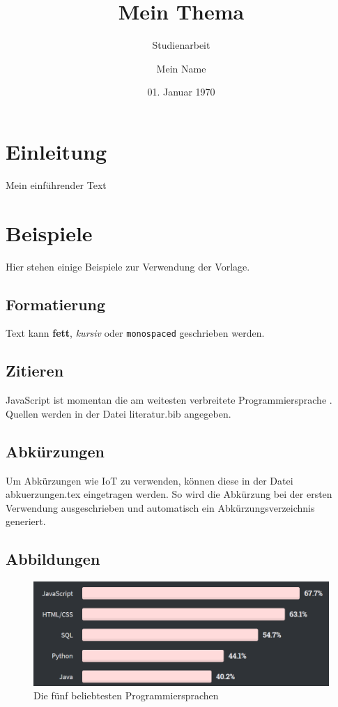 \documentclass[a4paper,12pt]{scrreprt}
\title{Mein Thema}
\subtitle{Studienarbeit}
\author{Mein Name}
\date{01. Januar 1970}
\begin{document}

\tableofcontents
\listoffigures
\listoftables
\listoflistings

\clearpage

\onehalfspacing
\chapter{Einleitung}
Mein einführender Text

\chapter{Beispiele}
Hier stehen einige Beispiele zur Verwendung der Vorlage.

\section{Formatierung}
Text kann \textbf{fett}, \textit{kursiv} oder \texttt{monospaced} geschrieben werden.

\section{Zitieren}
JavaScript ist momentan die am weitesten verbreitete Programmiersprache \parencite{stackOverflowSurvey}.
Quellen werden in der Datei literatur.bib angegeben.

\section{Abkürzungen}
Um Abkürzungen wie \ac{IoT} zu verwenden, können diese in der Datei abkuerzungen.tex eingetragen werden.
So wird die Abkürzung bei der ersten Verwendung ausgeschrieben und automatisch ein Abkürzungsverzeichnis generiert.

\section{Abbildungen}
\begin{figure}[h]
    \centering
    \includegraphics[width=\textwidth]{abbildungen/top5_languages.png}
    \caption{Die fünf beliebtesten Programmiersprachen \parencite{stackOverflowSurvey}}
    \label{fig:top5languages}
\end{figure}
\end{document}
